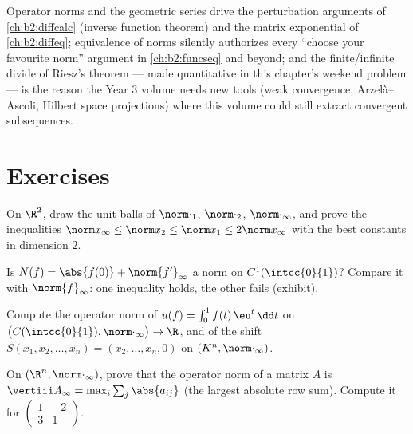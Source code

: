 \begin{remark}
Operator norms and the geometric series drive the perturbation
arguments of \cref{ch:b2:diffcalc} (inverse function theorem) and
the matrix exponential of \cref{ch:b2:diffeq}; equivalence of
norms silently authorizes every ``choose your favourite norm''
argument in \cref{ch:b2:funcseq} and beyond; and the
finite/infinite divide of Riesz's theorem --- made quantitative in
this chapter's weekend problem --- is the reason the Year 3
volume needs new tools (weak convergence, Arzel\`a--Ascoli,
Hilbert space projections) where this volume could still extract
convergent subsequences.
\end{remark}

\section{Exercises}

\begin{exercise}[$\star$]\label{exo:b2:nvs:1}
On $\R^2$, draw the unit balls of $\norm\cdot_1$, $\norm\cdot_2$,
$\norm\cdot_\infty$, and prove the inequalities $\norm x_\infty
\leq \norm x_2 \leq \norm x_1 \leq 2\norm x_\infty$ with the best
constants in dimension $2$.
\end{exercise}

\begin{exercise}[$\star$]\label{exo:b2:nvs:2}
Is $N(f) = \abs{f(0)} + \norm{f'}_\infty$ a norm on
$C^1(\intcc{0}{1})$? Compare it with $\norm{f}_\infty$: one
inequality holds, the other fails (exhibit).
\end{exercise}

\begin{exercise}[$\star$]\label{exo:b2:nvs:3}
Compute the operator norm of $u(f) = \int_0^1 f(t)\,\eu^t\,\dd t$
on $\bigl(C(\intcc{0}{1}), \norm\cdot_\infty\bigr) \to \R$, and of
the shift $S(x_1, x_2, \dots, x_n) = (x_2, \dots, x_n, 0)$ on
$(K^n, \norm\cdot_\infty)$.
\end{exercise}

\begin{exercise}[$\star\star$]\label{exo:b2:nvs:4}
On $(\R^n, \norm\cdot_\infty)$, prove that the operator norm of a
matrix $A$ is $\vertiii A_\infty = \max_i \sum_j \abs{a_{ij}}$ (the
largest absolute row sum). Compute it for $\begin{pmatrix} 1 & -2\\
3 & 1\end{pmatrix}$.
\end{exercise}

